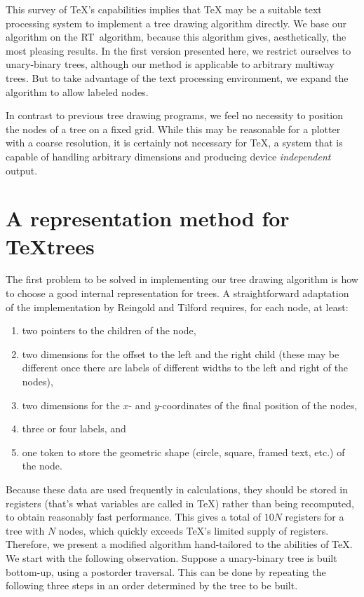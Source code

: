 This survey of \TeX's capabilities implies that \TeX{} may be a suitable
text processing system to implement a tree drawing algorithm directly.
We base our algorithm on the RT~algorithm, because this algorithm
gives, aesthetically, the most pleasing results. In the first version
presented here, we
restrict ourselves to unary-binary trees, although our method is
applicable to arbitrary multiway trees. But to take advantage
of the text processing environment, we expand the algorithm to allow
labeled nodes.

In contrast to previous tree drawing programs, we feel no necessity to
position the nodes of a tree on a fixed grid. While this may be
reasonable for a plotter with a coarse resolution, it is certainly not
necessary for \TeX, a system that is capable of handling
arbitrary dimensions
and producing device \emph{independent} output.


\section{A representation method for \TeX{}trees}

The first problem to be solved in implementing our tree drawing algorithm
is how to choose a good internal representation
for trees. A straightforward adaptation
of the implementation by Reingold and Tilford requires, for each node,
at least:
%
\begin{enumerate}
\item two pointers to the children of the node,
\item two dimensions for the offset to the left and the right child (these
      may be different once there are labels of different widths to the
      left and right of the nodes),
\item two dimensions for the $x$- and $y$-coordinates of the final
      position of the nodes,
\item three or four labels, and
\item one token to store the geometric shape (circle, square, framed text, etc.)
      of the node.
\end{enumerate}
%
Because these data are used frequently in calculations, they should be
stored in registers (that's what variables are called in \TeX)
rather than being recomputed, to obtain
reasonably fast performance. This gives a total of $10N$ registers for
a tree with $N$ nodes, which quickly exceeds
\TeX's limited supply of registers. Therefore, we present a
modified algorithm hand-tailored to the abilities of \TeX{}.
We start with the following observation.
Suppose a unary-binary tree is built bottom-up, using a postorder
traversal. This can be done by repeating the following three steps in
an order determined by the tree to be built.

